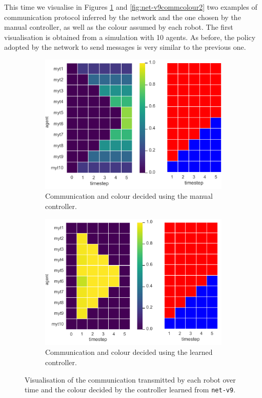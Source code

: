 This time we visualise in Figures \ref{fig:net-v9commcolour} and 
\ref{fig:net-v9commcolour2} two examples of communication protocol inferred 
by the network and the one chosen by the manual controller, as well as the colour 
assumed by each robot.
The first visualisation is obtained from a simulation with 10 agents. 
As before, the policy adopted by the network to send messages is very similar to 
the previous one. 
\begin{figure}[!htb]
	\begin{subfigure}[h]{\textwidth}
		\centering
		\includegraphics[width=.6\textwidth]{contents/images/net-v9/net-v9-manual-0}
		\caption{Communication and colour decided using the manual controller.}
	\end{subfigure}
	\hspace*{\fill}%
	\vspace*{8pt}%
	\hspace*{\fill}%
	\begin{subfigure}[h]{\textwidth}
		\centering			
		\includegraphics[width=.6\textwidth]{contents/images/net-v9/net-v9-learned-0}
		\caption{Communication and colour decided using the learned controller.}
	\end{subfigure}
	\caption[Evaluation of the communication learned by 
	\texttt{net-v9}.]{Visualisation of the communication transmitted by each 
		robot over time and the colour decided by the controller learned from 
		\texttt{net-v9}.}	
	\label{fig:net-v9commcolour}
\end{figure}
